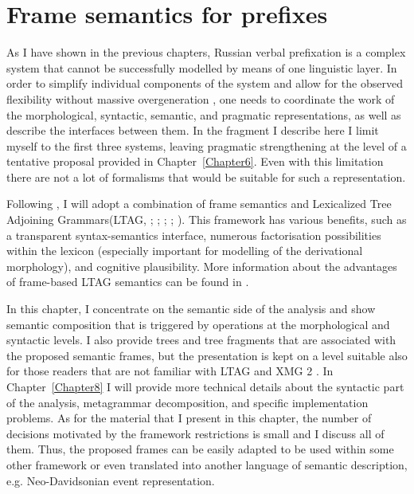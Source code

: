 
\chapter{Frame semantics for prefixes} %
\label{Chapter7}

As I have shown in the previous chapters, Russian verbal prefixation  is a complex system that cannot be successfully modelled by means of one linguistic layer. In order to simplify individual components of the system and allow for the observed flexibility without massive overgeneration , one needs to coordinate the work of the morphological, syntactic, semantic, and pragmatic representations, as well as describe the interfaces between them. In the fragment I describe here I limit myself to the first three systems, leaving pragmatic strengthening at the level of a tentative proposal provided in Chapter~\ref{Chapter6}. Even with this limitation there are not a lot of formalisms that would be suitable for such a representation.

Following \citet{KallmeyerOsswald:12, KallmeyerOsswald:13}, I will adopt a combination of frame semantics \citep{Fillmore:82} and Lexicalized Tree Adjoining Grammars\linebreak (LTAG, \citealt{JoshiSchabes:97}; \citealt{Frank:92}; \citealt{AbeilleRambow:00}; \citealt{Abeille:02}; \citealt{Frank:02}). This framework has various benefits, such as a transparent syntax-se\-man\-tics interface, numerous factorisation possibilities within the lexicon (especially important for modelling of the derivational morphology), and cognitive plausibility. More information about the advantages of frame-based LTAG semantics can be found in \citet{KallmeyerOsswald:13}. 

In this chapter, I concentrate on the semantic side of the analysis and show semantic composition that is triggered by operations at the morphological and syntactic levels. I also provide trees and tree fragments that are associated with the proposed semantic frames, but the presentation is kept on a level suitable also for those readers that are not familiar with LTAG and XMG 2 \citep{Petitjean:16}. In Chapter~\ref{Chapter8} I will provide more technical details about the syntactic part of the analysis, metagrammar decomposition, and specific implementation problems. As for the material that I present in this chapter, the number of decisions motivated by the framework restrictions is small and I discuss all of them. Thus, the proposed frames can be easily adapted to be used within some other framework or even translated into another language of semantic description, e.g. Neo-Davidsonian event representation.

